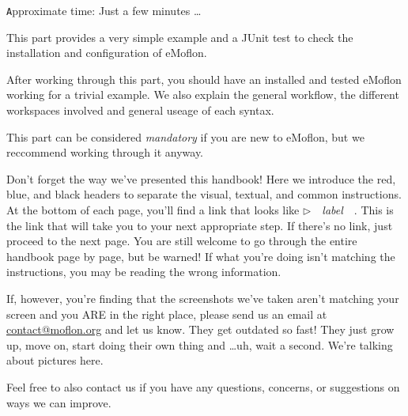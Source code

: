 {\small \texttt Approximate time: Just a few minutes \ldots}

This part provides a very simple example and a JUnit test to check the installation and configuration of eMoflon.

After working through this part, you should have an installed and tested eMoflon working for a trivial example.
We also explain the general workflow, the different workspaces involved and general useage of each syntax.

This part can be considered \emph{mandatory} if you are new to eMoflon, but we reccommend working through it anyway.

Don't forget the way we've presented this handbook! Here we introduce the red, blue, and black headers to separate the visual, textual, and common instructions. At the bottom of each page, you'll find a link that looks like \mbox{$\triangleright$ { \textt \emph{label} } }. This is the link that will take you to your next appropriate step. If there's no link, just proceed to the next page. You are still welcome to go through the entire handbook page by page, but be warned! If what you're doing isn't matching the instructions, you may be reading the wrong information. 

If, however, you're finding that the screenshots we've taken aren't matching your screen and you ARE in the right place, please send us an email at \href{mailto:contact@moflon.org}{contact@moflon.org} and let us know. They get outdated so fast! They just grow up, move on, start doing their own thing and \ldots uh, wait a second. We're talking about pictures here.

Feel free to also contact us if you have any questions, concerns, or suggestions on ways we can improve.

\pagebreak